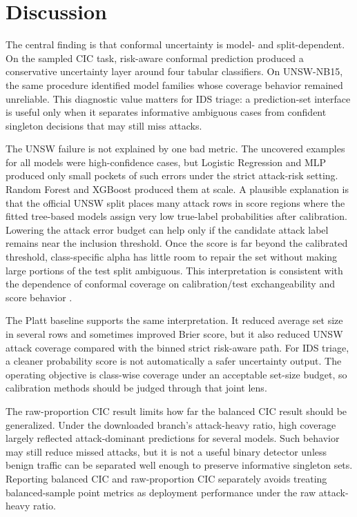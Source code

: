 \documentclass[11pt]{article}
\begin{document}


\section{Discussion}

The central finding is that conformal uncertainty is model- and split-dependent. On the sampled CIC task, risk-aware conformal prediction produced a conservative uncertainty layer around four tabular classifiers. On UNSW-NB15, the same procedure identified model families whose coverage behavior remained unreliable. This diagnostic value matters for IDS triage: a prediction-set interface is useful only when it separates informative ambiguous cases from confident singleton decisions that may still miss attacks.

The UNSW failure is not explained by one bad metric. The uncovered examples for all models were high-confidence cases, but Logistic Regression and MLP produced only small pockets of such errors under the strict attack-risk setting. Random Forest and XGBoost produced them at scale. A plausible explanation is that the official UNSW split places many attack rows in score regions where the fitted tree-based models assign very low true-label probabilities after calibration. Lowering the attack error budget can help only if the candidate attack label remains near the inclusion threshold. Once the score is far beyond the calibrated threshold, class-specific alpha has little room to repair the set without making large portions of the test split ambiguous. This interpretation is consistent with the dependence of conformal coverage on calibration/test exchangeability and score behavior \cite{vovk2022algorithmic,angelopoulos2023conformal,ding2023class}.

The Platt baseline supports the same interpretation. It reduced average set size in several rows and sometimes improved Brier score, but it also reduced UNSW attack coverage compared with the binned strict risk-aware path. For IDS triage, a cleaner probability score is not automatically a safer uncertainty output. The operating objective is class-wise coverage under an acceptable set-size budget, so calibration methods should be judged through that joint lens.

The raw-proportion CIC result limits how far the balanced CIC result should be generalized. Under the downloaded branch's attack-heavy ratio, high coverage largely reflected attack-dominant predictions for several models. Such behavior may still reduce missed attacks, but it is not a useful binary detector unless benign traffic can be separated well enough to preserve informative singleton sets. Reporting balanced CIC and raw-proportion CIC separately avoids treating balanced-sample point metrics as deployment performance under the raw attack-heavy ratio.
\end{document}
